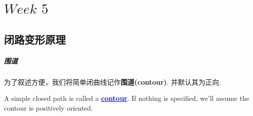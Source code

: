 \ifx\allfiles\undefined


	\else
	\fi

\chapter{$Week \,\, 5$}
\section{闭路变形原理}
\paragraph{围道}
为了叙述方便，我们将简单闭曲线记作\textbf{围道(contour)}. 并默认其为正向.
\begin{defn}\label{def 5.1.1}
	A simple closed path is called a \underline{\textcolor{blue}{\textbf{contour}}}. If nothing is specified, we'll assume the contour is positively oriented.
\end{defn}

\vspace{2em}
